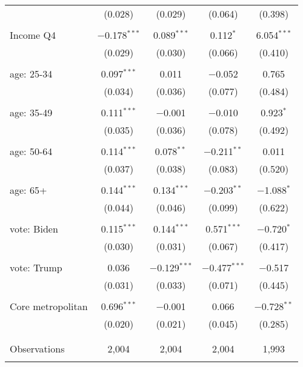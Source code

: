 \begin{tabular}{@{\extracolsep{5pt}}lcccc}
  & (0.028) & (0.029) & (0.064) & (0.398) \\ 
  & & & & \\ 
 Income Q4 & $-$0.178$^{***}$ & 0.089$^{***}$ & 0.112$^{*}$ & 6.054$^{***}$ \\ 
  & (0.029) & (0.030) & (0.066) & (0.410) \\ 
  & & & & \\ 
 age: 25-34 & 0.097$^{***}$ & 0.011 & $-$0.052 & 0.765 \\ 
  & (0.034) & (0.036) & (0.077) & (0.484) \\ 
  & & & & \\ 
 age: 35-49 & 0.111$^{***}$ & $-$0.001 & $-$0.010 & 0.923$^{*}$ \\ 
  & (0.035) & (0.036) & (0.078) & (0.492) \\ 
  & & & & \\ 
 age: 50-64 & 0.114$^{***}$ & 0.078$^{**}$ & $-$0.211$^{**}$ & 0.011 \\ 
  & (0.037) & (0.038) & (0.083) & (0.520) \\ 
  & & & & \\ 
 age: 65+ & 0.144$^{***}$ & 0.134$^{***}$ & $-$0.203$^{**}$ & $-$1.088$^{*}$ \\ 
  & (0.044) & (0.046) & (0.099) & (0.622) \\ 
  & & & & \\ 
 vote: Biden & 0.115$^{***}$ & 0.144$^{***}$ & 0.571$^{***}$ & $-$0.720$^{*}$ \\ 
  & (0.030) & (0.031) & (0.067) & (0.417) \\ 
  & & & & \\ 
 vote: Trump & 0.036 & $-$0.129$^{***}$ & $-$0.477$^{***}$ & $-$0.517 \\ 
  & (0.031) & (0.033) & (0.071) & (0.445) \\ 
  & & & & \\ 
 Core metropolitan & 0.696$^{***}$ & $-$0.001 & 0.066 & $-$0.728$^{**}$ \\ 
  & (0.020) & (0.021) & (0.045) & (0.285) \\ 
  & & & & \\ 
\hline \\[-1.8ex] 

Observations & 2,004 & 2,004 & 2,004 & 1,993 \\ 
\hline 
\hline \\[-1.8ex] 
\end{tabular} 